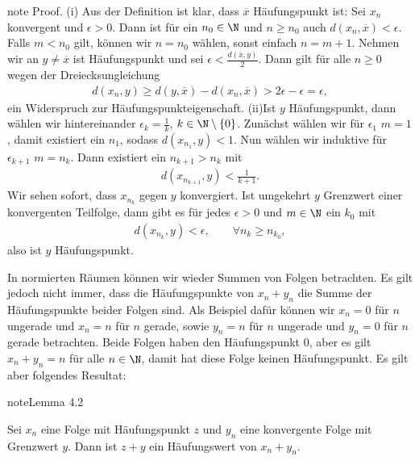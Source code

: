 \documentclass[letterpaper,10pt,english]{jupyterBook}
\begin{document}
\begin{sphinxadmonition}{note}
Proof.  (i) Aus der Definition ist klar, dass \(\overline{x}\) Häufungspunkt ist: Sei \(x_n\) konvergent und \(\epsilon > 0\). Dann ist für ein \(n_0 \in \N\) und \(n \geq n_0\) auch \(d(x_n, \overline{x}) < \epsilon\). Falls \(m < n_0\) gilt, können wir \(n=n_0\) wählen, sonst einfach \(n=m+1\). Nehmen wir an \(y \neq \overline{x}\) ist Häufungspunkt und sei \(\epsilon < \frac{d(\overline{x},y)}2\). Dann gilt für alle \(n \geq 0\) wegen der Dreiecksungleichung
\begin{equation*}
\begin{split} d(x_n,y) \geq d(y,\overline{x}) - d(x_n,\overline{x}) > 2 \epsilon - \epsilon = \epsilon,\end{split}
\end{equation*}
ein Widerspruch zur Häufungspunkteigenschaft.
(ii)Ist \(y\) Häufungspunkt, dann wählen wir hintereinander \(\epsilon_k = \frac{1}k\), \(k \in \N \setminus \{0\}\). Zunächst wählen wir für \(\epsilon_1\) \(m=1\), damit existiert ein \(n_1\), sodass \(d(x_{n_1},y) < 1\). Nun wählen wir induktive für \(\epsilon_{k+1}\)  \(m=n_k\). Dann existiert ein \(n_{k+1} > n_k\) mit
\begin{equation*}
\begin{split} d(x_{n_{k+1}},y) < \frac{1}{k+1}.\end{split}
\end{equation*}
Wir sehen sofort, dass \(x_{n_k}\) gegen \(y\) konvergiert.
Ist umgekehrt \(y\) Grenzwert einer konvergenten Teilfolge, dann gibt es für jedes \(\epsilon >0 \) und \(m \in \N\) ein \(k_0 \) mit
\begin{equation*}
\begin{split} d(x_{n_k},y) < \epsilon, \qquad \forall n_k \geq n_{k_0},\end{split}
\end{equation*}
also ist \(y\) Häufungspunkt.
\end{sphinxadmonition}

In normierten Räumen können wir wieder Summen von Folgen betrachten. Es gilt jedoch nicht immer, dass die Häufungspunkte von \(x_n+y_n\) die Summe der Häufungspunkte beider Folgen sind. Als Beispiel dafür können wir \(x_n=0\) für \(n\) ungerade und \(x_n=n\) für \(n\) gerade, sowie \(y_n=n\) für \(n\) ungerade und \(y_n=0\) für \(n\) gerade betrachten. Beide Folgen haben den Häufungspunkt \(0\), aber es gilt \(x_n+y_n = n\) für alle \(n \in \N\), damit hat diese Folge keinen Häufungspunkt. Es gilt aber folgendes Resultat:
\label{metrik/teilfolgen:lemma-4}
\begin{sphinxadmonition}{note}{Lemma 4.2}



Sei \(x_n\) eine Folge mit Häufungspunkt \(z\) und \(y_n\) eine konvergente Folge mit Grenzwert \(y\). Dann ist \(z+y\) ein Häufungswert von \(x_n + y_n\).
\end{sphinxadmonition}
\end{document}

